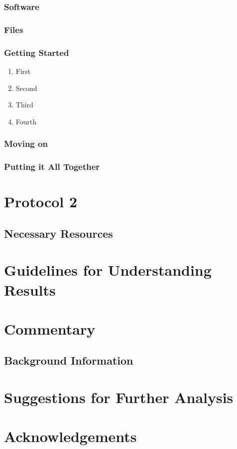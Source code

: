 \subsubsection*{Software}

\subsubsection*{Files}

\subsubsection*{Getting Started}
\begin{enumerate}
   \item First
   \item Second
   \item Third
   \item Fourth
\end{enumerate}

\subsubsection*{Moving on}

\subsubsection*{Putting it All Together}



\section{Protocol 2}\label{protocol2}

\subsection*{Necessary Resources}


\section*{Guidelines for Understanding Results}\label{sec:understand_results}


\section*{Commentary}

\subsection*{Background Information}

\section*{Suggestions for Further Analysis}

\section*{Acknowledgements}




